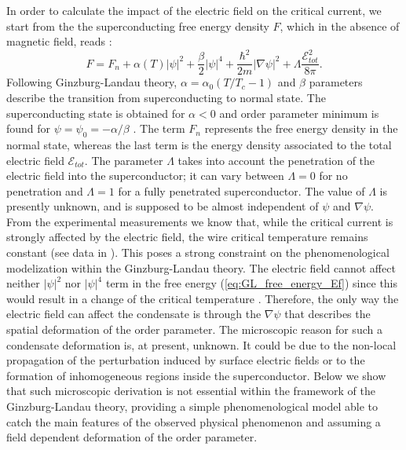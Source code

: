 \documentclass[prl,twocolumn,reprint,graphicx,showpacs,superscriptaddress,floatfix]{revtex4-1}
\newcommand{\mathE}{\mathcal{E} }
\begin{document}
In order to calculate the impact of the electric field on the critical current, we start from the
 the superconducting free energy density $F$, which in the absence of magnetic field, reads \cite{Landau1950_SI, degennes_SI, Tinkham1_SI}:
\begin{equation}
F = F_n + \alpha(T) |\psi|^2 + \frac{\beta}{2} |\psi|^4 + \frac{\hbar^2}{2 m } \Big|  \nabla  \psi \Big|^2 + \Lambda \frac{\mathE_{tot}^2}{8 \pi}.
 \label{eq:GL_free_energy_Ef}
\end{equation}
Following Ginzburg-Landau theory, $\alpha = \alpha_0 (T/T_c -1)$ and $\beta$ parameters describe the transition from superconducting to normal state.
The superconducting state is obtained for $\alpha<0$ and order parameter minimum is found for $\psi = \psi_0 = -\alpha/\beta$ \cite{degennes_SI, Tinkham1_SI}.
The term $F_n$ represents the free energy density in the normal state, whereas the last term is the energy density associated to the total electric field $\mathE_{tot}$.
The parameter $\Lambda$ takes into account the penetration of the electric field into the superconductor; it can vary between $\Lambda = 0$ for no penetration and 
$\Lambda =1$ for a fully penetrated superconductor.
The value of $\Lambda$ is presently unknown, and is supposed to be almost independent of $\psi$ and $\nabla \psi$.
From the experimental measurements we know that, while the critical current is strongly affected by the electric field, the wire critical temperature remains constant (see data in \cite{Paolucci2018}). This poses a strong constraint on the phenomenological modelization within the Ginzburg-Landau theory. The electric field cannot affect neither $|\psi|^2$ nor $|\psi|^4$ term in the free energy (\ref{eq:GL_free_energy_Ef}) since this would result in a change of  the critical temperature \cite{degennes_SI, Tinkham1_SI}. Therefore, the only way the electric field can affect the condensate is through the $\nabla  \psi$ that describes the spatial deformation of the order parameter. The microscopic reason for such a condensate deformation is, at present, unknown. 
It could be due to the non-local propagation of the perturbation induced by  surface electric fields or to the formation of inhomogeneous regions inside the superconductor. Below we show that such microscopic derivation is not essential within the framework of the Ginzburg-Landau theory, providing a simple phenomenological model able to catch the main features of the observed physical phenomenon and assuming a field dependent deformation of the order parameter.
\end{document}
